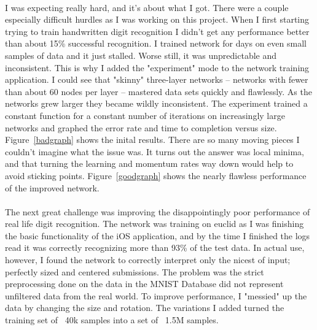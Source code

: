 \documentclass{article}
\begin{document}
    \paragraph{}I was expecting really hard, and it's about what I got. There were 
    a couple especially difficult hurdles as I was working on this project. When I
    first starting trying to train handwritten digit recognition I didn't
    get any performance better than about 15\% successful recognition. I trained
    network for days on even small samples of data and it just stalled. Worse 
    still, it was unpredictable and inconsistent. This is why I added the 
    "experiment" mode to the network training application. I could see that 
    "skinny" three-layer networks -- networks with fewer than about 60 nodes per 
    layer -- mastered data sets quickly and flawlessly. As the networks grew larger
    they became wildly inconsistent. The experiment trained a constant function for
    a constant number of iterations on increasingly large networks and graphed the 
    error rate and time to completion versus size. Figure~\ref{badgraph} shows the 
    inital results. There are so many moving pieces I couldn't imagine what the 
    issue was. It turns out the answer was local minima, and that turning the 
    learning and momentum rates way down would help to avoid sticking points.
    Figure~\ref{goodgraph} shows the nearly flawless performance of the improved 
    network.

    \paragraph{}The next great challenge was improving the disappointingly poor 
    performance of real life digit recognition. The network was training on euclid 
    as I was finishing the basic functionality of the iOS application, and by the 
    time I finished the logs read it was correctly recognizing more than 93\% of 
    the test data. In actual use, however, I found the network to correctly 
    interpret only the nicest of input; perfectly sized and centered submissions.
    The problem was the strict preprocessing done on the data in the MNIST Database
    did not represent unfiltered data from the real world. To improve performance,
    I "messied" up the data by changing the size and rotation. The variations I 
    added turned the training set of ~40k samples into a set of ~1.5M samples. 
\end{document}
